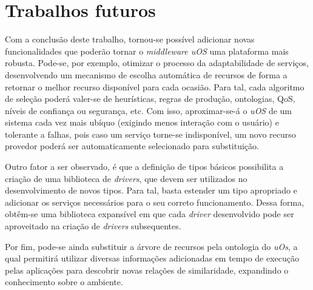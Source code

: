 \section{Trabalhos futuros}
\label{sec:trabalhosFuturos}

Com a conclusão deste trabalho, tornou-se possível adicionar novas funcionalidades que poderão tornar o \emph{middleware uOS} uma plataforma mais robusta. Pode-se, por exemplo, otimizar o processo da adaptabilidade de serviços, desenvolvendo um mecanismo de escolha automática de recursos de forma a retornar o melhor recurso disponível para cada ocasião. Para tal, cada algoritmo de seleção poderá valer-se de heurísticas, regras de produção, ontologias, QoS, níveis de confiança ou segurança, etc. Com isso, aproximar-se-á o \emph{uOS} de um sistema cada vez mais ubíquo (exigindo menos interação com o usuário) e tolerante a falhas, pois caso um serviço torne-se indisponível, um novo recurso provedor poderá ser automaticamente selecionado para substituição.

Outro fator a ser observado, é que a definição de tipos básicos possibilita a criação de uma biblioteca de \emph{drivers}, que devem ser utilizados no desenvolvimento de novos tipos. Para tal, basta estender um tipo apropriado e adicionar os serviços necessários para o seu correto funcionamento. Dessa forma, obtêm-se uma biblioteca expansível em que cada \emph{driver} desenvolvido pode ser aproveitado na criação de \emph{drivers} subsequentes.

Por fim, pode-se ainda substituir a árvore de recursos pela ontologia do \emph{uOs}, a qual permitirá utilizar diversas informações adicionadas em tempo de execução pelas aplicações para descobrir novas relações de  similaridade, expandindo o conhecimento sobre o ambiente.